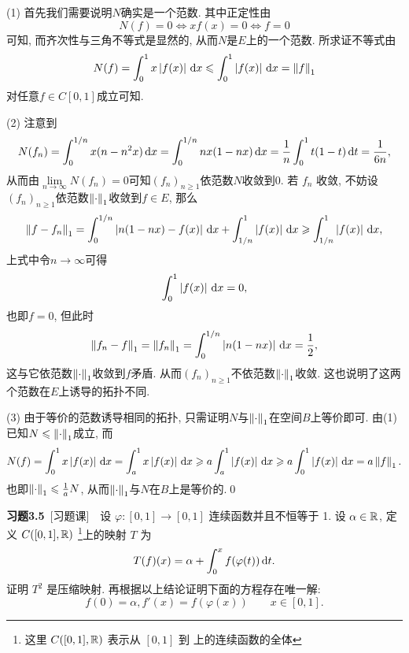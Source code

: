     \begin{Proof}
    (1) 首先我们需要说明$ N $确实是一个范数. 其中正定性由
    \[
    N(f)=0\Longleftrightarrow xf(x)=0\Longleftrightarrow f=0
    \]
    可知, 而齐次性与三角不等式是显然的, 从而$ N $是$ E $上的一个范数. 所求证不等式由
    \[
    N(f)=\int_0^1x\left| f(x) \right| \,\mathrm{d} x\leqslant\int_0^1\left| f(x) \right| \,\mathrm{d} x=\left\| f \right\|_1
    \]
    对任意$ f\in C[0,1] $成立可知.

    (2) 注意到
    \[
    N(f_n)=\int_0^{1/n}x(n-n^2x)\,\mathrm{d} x=\int_0^{1/n}nx(1-nx)\,\mathrm{d} x=\frac{1}{n}\int_0^1t(1-t)\,\mathrm{d} t=\frac{1}{6n},
    \]
    从而由$ \lim\limits_{n\to\infty}N(f_n)=0 $可知$ (f_n)_{n\geqslant 1} $依范数$ N $收敛到0. 若 $ f_{n} $ 收敛, 不妨设$ (f_n)_{n\geqslant 1} $依范数$ \left\| \cdot \right\|_1 $收敛到$ f\in E $, 那么
    \[
    \left\| f-f_n \right\|_1=\int_0^{1/n}\left| n(1-nx)-f(x) \right| \,\mathrm{d} x+\int_{1/n}^1\left| f(x) \right| \,\mathrm{d} x\geqslant\int_{1/n}^1\left| f(x) \right| \,\mathrm{d} x,
    \]
    上式中令$ n\to\infty $可得
    \[
    \int_0^1\left| f(x) \right| \,\mathrm{d} x=0,
    \]
    也即$ f=0 $, 但此时
    \[
    \left\| f_n-f \right\|_1=\left\| f_n \right\|_{1}=\int_0^{1/n}\left| n(1-nx) \right| \,\mathrm{d} x=\frac{1}{2},
    \]
    这与它依范数$ \left\| \cdot \right\|_1 $收敛到$ f $矛盾. 从而$ (f_n)_{n\geqslant 1} $不依范数$ \left\| \cdot \right\|_1 $收敛. 这也说明了这两个范数在$ E $上诱导的拓扑不同.

    (3) 由于等价的范数诱导相同的拓扑, 只需证明$ N $与$ \left\| \cdot \right\|_1 $在空间$ B $上等价即可. 由(1)已知$ N\leqslant\left\| \cdot \right\|_1 $成立, 而
    \[
    N(f)=\int_0^1x\left| f(x) \right| \,\mathrm{d} x=\int_a^1x\left| f(x) \right| \,\mathrm{d} x\geqslant a\int_a^1\left| f(x) \right| \,\mathrm{d} x\geqslant a\int_0^1\left| f(x) \right| \,\mathrm{d} x=a\left\| f \right\|_1.
    \]
    也即$ \left\| \cdot \right\|_1\leqslant\frac{1}{a}N $, 从而$ \left\| \cdot \right\|_1 $与$ N $在$ B $上是等价的.\qed
    \end{Proof}

    \textbf{习题3.5}\ [习题课]\ \ 设 $ \varphi:[0, 1]\to [0, 1] $ 连续函数并且不恒等于 1. 设 $ \alpha\in\mathbb{R} $, 定义 $ C([0, 1],\mathbb{R}) $ \footnote{这里 $ C([0, 1],\mathbb{R}) $ 表示从 $ [0, 1] $ 到 \R 上的连续函数的全体 }上的映射 $ T $ 为
    \[
        T(f)(x)=\alpha+\int_{0}^{x}f(\varphi(t))\,\mathrm{d} t.
    \]
    证明 $ T^2 $ 是压缩映射. 再根据以上结论证明下面的方程存在唯一解:
    \begin{equation}\label{eq:3.5题公式}
        f(0)=\alpha, f'(x)=f(\varphi(x))\qquad x\in[0, 1].
    \end{equation}

